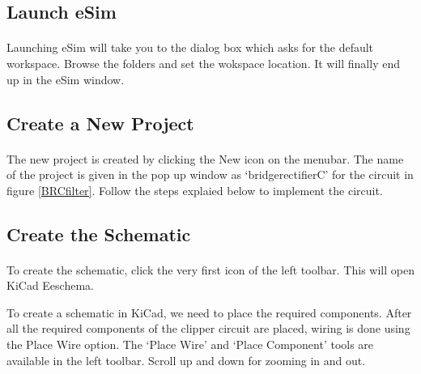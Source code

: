 \subsection*{Launch eSim}

\paragraph{}
 Launching eSim will take you to the dialog box which asks for the default workspace. Browse the folders and set the wokspace location. It will finally end up in the eSim window.%

\subsection*{Create a New Project}

\paragraph{ } The new project is created by clicking the New icon on the
menubar. The name of the project is given in the pop up window as `bridgerectifierC' for the circuit in figure \ref{BRCfilter}. Follow the steps explaied below to implement the circuit.
\subsection*{Create the Schematic}

\paragraph{}  To create the schematic, click the very first icon of the
left toolbar. This will open KiCad Eeschema.


To create a schematic in KiCad, we need to place the required components. After all the required components of the clipper circuit are placed, wiring is
done using the Place Wire option. The `Place Wire' and `Place Component' tools are available in the left toolbar. Scroll up and down for zooming in and out.





